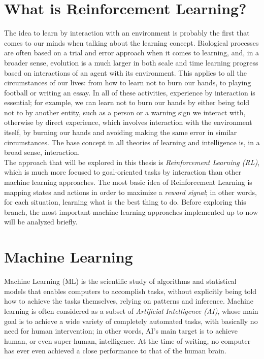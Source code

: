 
\section{What is Reinforcement Learning?}

The idea to learn by interaction with an environment is probably the first that comes to our minds when talking about the learning concept. Biological processes are often based on a trial and error approach when it comes to learning, and, in a broader sense, evolution is a much larger in both scale and time learning progress based on interactions of an agent with its environment. This applies to all the circumstances of our lives: from how to learn not to burn our hands, to playing football or writing an essay. In all of these activities, experience by interaction is essential; for example, we can learn not to burn our hands by either being told not to by another entity, such as a person or a warning sign we interact with, otherwise by direct experience, which involves interaction with the environment itself, by burning our hands and avoiding making the same error in similar circumstances. The base concept in all theories of learning and intelligence is, in a broad sense, interaction.
\\
\indent
The approach that will be explored in this thesis is \textit{Reinforcement Learning (RL)}, which is much more focused to goal-oriented tasks by interaction than other machine learning approaches. The most basic idea of Reinforcement Learning is mapping states and actions in order to maximize a \textit{reward signal}; in other words, for each situation, learning what is the best thing to do. Before exploring this branch, the most important machine learning approaches implemented up to now will be analyzed briefly.

\section{Machine Learning}

Machine Learning (ML) is the scientific study of algorithms and statistical models that enables computers to accomplish tasks, without explicitly being told how to achieve the tasks themselves, relying on patterns and inference. Machine learning is often considered as a subset of \textit{Artificial Intelligence (AI)}, whose main goal is to achieve a wide variety of completely automated tasks, with basically no need for human intervention; in other words, AI's main target is to achieve human, or even super-human, intelligence. At the time of writing, no computer has ever even achieved a close performance to that of the human brain.
\\


